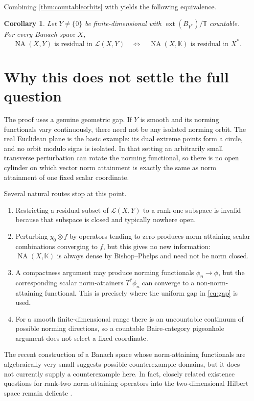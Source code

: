 \documentclass[11pt]{article}
\newtheorem{corollary}[theorem]{Corollary}
\theoremstyle{definition}
\theoremstyle{remark}
\newcommand{\K}{\mathbb K}
\newcommand{\T}{\mathbb T}
\newcommand{\NA}{\operatorname{NA}}
\newcommand{\calL}{\mathcal L}
\newcommand{\ext}{\operatorname{ext}}
\begin{document}
Combining \cref{thm:countableorbits} with \cite[Example~3.18(a)]{JMRZ} yields the following equivalence.

\begin{corollary}\label{cor:equivalence}
Let $Y\ne\{0\}$ be finite-dimensional with
$\ext(B_{Y^*})/\T$ countable.  For every Banach space $X$,
\[
 \NA(X,Y)\text{ is residual in }\calL(X,Y)
 \quad\Longleftrightarrow\quad
 \NA(X,\K)\text{ is residual in }X^*.
\]
\end{corollary}

\section{Why this does not settle the full question}

The proof uses a genuine geometric gap.  If $Y$ is smooth and its norming functionals vary continuously, there need not be any isolated norming orbit.  The real Euclidean plane is the basic example: its dual extreme points form a circle, and no orbit modulo signs is isolated.  In that setting an arbitrarily small transverse perturbation can rotate the norming functional, so there is no open cylinder on which vector norm attainment is exactly the same as norm attainment of one fixed scalar coordinate.

Several natural routes stop at this point.
\begin{enumerate}[label=(\roman*),leftmargin=2.2em]
\item Restricting a residual subset of $\calL(X,Y)$ to a rank-one subspace is invalid because that subspace is closed and typically nowhere open.
\item Perturbing $y_0\otimes f$ by operators tending to zero produces norm-attaining scalar combinations converging to $f$, but this gives no new information: $\NA(X,\K)$ is always dense by Bishop--Phelps and need not be norm closed.
\item A compactness argument may produce norming functionals $\phi_n\to\phi$, but the corresponding scalar norm-attainers $T^*\phi_n$ can converge to a non-norm-attaining functional.  This is precisely where the uniform gap in \eqref{eq:gap} is used.
\item For a smooth finite-dimensional range there is an uncountable continuum of possible norming directions, so a countable Baire-category pigeonhole argument does not select a fixed coordinate.
\end{enumerate}

The recent construction of a Banach space whose norm-attaining functionals are algebraically very small \cite{Martin} suggests possible counterexample domains, but it does not currently supply a counterexample here.  In fact, closely related existence questions for rank-two norm-attaining operators into the two-dimensional Hilbert space remain delicate \cite{Martin,KLMW}.
\end{document}
